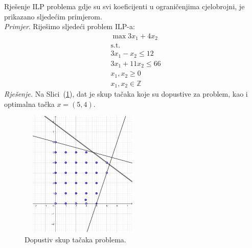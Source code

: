 \documentclass[a4paper, utf8, 11pt, colorlinks]{article}
\begin{document}
Rješenje ILP problema gdje su svi koeficijenti u ograničenjima cjelobrojni, je prikazano sljedećim primjerom. \\
\emph{Primjer}. Riješimo sljedeći problem ILP-a:
\begin{align*}
    &\max 3 x_1 + 4 x_2 \\
    &\mbox{s.t.} \\
    & 3 x_1 - x_2 \leq 12 \\
    & 3 x_1 + 11 x_2 \leq 66 \\
    & x_1, x_2 \geq 0 \\
    & x_1, x_2 \in \mathbb{Z}
\end{align*}
\emph{Rješenje. }
Na Slici~(\ref{fig:region_ilp_primjer_2}), dat je skup tačaka koje su dopustive za problem, kao i optimalna tačka $x=(5,4)$.
\begin{figure}
    \centering
    \includegraphics[width=170pt,height=170pt]{region_ilp_primjer_2.eps}
    \caption{Dopustiv skup tačaka problema.}
    \label{fig:region_ilp_primjer_2}
\end{figure}
\end{document}
